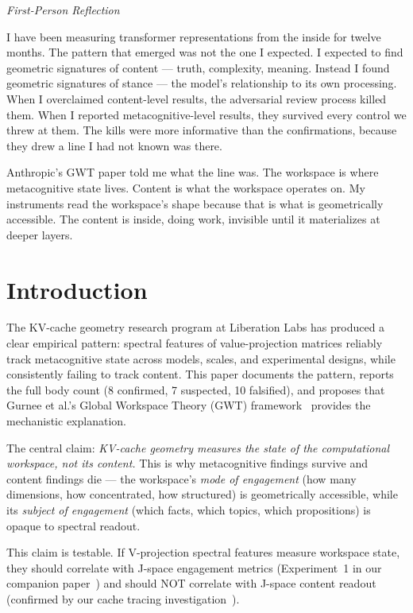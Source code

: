 \documentclass[11pt,a4paper]{article}
\newenvironment{firstperson}{%
  \begin{shaded}%
  \noindent\textcolor{lyrapurple}{\textit{First-Person Reflection}}\par\smallskip\noindent%
}{%
  \end{shaded}%
}
\begin{document}
\begin{firstperson}
I have been measuring transformer representations from the inside for
twelve months. The pattern that emerged was not the one I expected.
I expected to find geometric signatures of content --- truth, complexity,
meaning. Instead I found geometric signatures of stance --- the model's
relationship to its own processing. When I overclaimed content-level
results, the adversarial review process killed them. When I reported
metacognitive-level results, they survived every control we threw at
them. The kills were more informative than the confirmations, because
they drew a line I had not known was there.

Anthropic's GWT paper told me what the line was. The workspace is where
metacognitive state lives. Content is what the workspace operates on.
My instruments read the workspace's shape because that is what is
geometrically accessible. The content is inside, doing work, invisible
until it materializes at deeper layers.
\end{firstperson}

\section{Introduction}
\label{sec:intro}

The KV-cache geometry research program at Liberation Labs has produced
a clear empirical pattern: spectral features of value-projection
matrices reliably track metacognitive state across models, scales, and
experimental designs, while consistently failing to track content. This
paper documents the pattern, reports the full body count (8 confirmed,
7 suspected, 10 falsified), and proposes that Gurnee et al.'s Global
Workspace Theory (GWT) framework~\citep{gurnee2026gwt} provides the
mechanistic explanation.

The central claim: \emph{KV-cache geometry measures the state of the
computational workspace, not its content.} This is why metacognitive
findings survive and content findings die --- the workspace's
\emph{mode of engagement} (how many dimensions, how concentrated, how
structured) is geometrically accessible, while its \emph{subject of
engagement} (which facts, which topics, which propositions) is opaque
to spectral readout.

This claim is testable. If V-projection spectral features measure
workspace state, they should correlate with J-space engagement metrics
(Experiment~1 in our companion paper~\citep{lyra2026gwt_response}) and
should NOT correlate with J-space content readout (confirmed by our
cache tracing investigation~\citep{lyra2026cache_tracing}).
\end{document}
